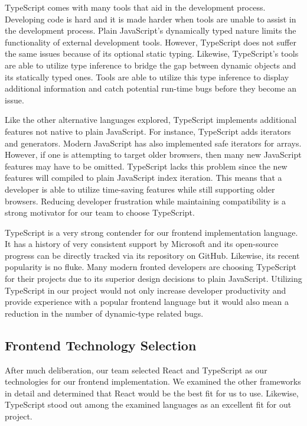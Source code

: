 \documentclass[12pt]{report}
\begin{document}
\begin{enumerate}
TypeScript comes with many tools that aid in the development process. Developing code is hard and it is made harder when tools are unable to assist in the development process. Plain JavaScript's dynamically typed nature limits the functionality of external development tools. However, TypeScript does not suffer the same issues because of its optional static typing. Likewise, TypeScript's tools are able to utilize type inference to bridge the gap between dynamic objects and its statically typed ones.\cite{typescripthomepage} Tools are able to utilize this type inference to display additional information and catch potential run-time bugs before they become an issue.

Like the other alternative languages explored, TypeScript implements additional features not native to plain JavaScript. For instance, TypeScript adds iterators and generators. Modern JavaScript has also implemented safe iterators for arrays. However, if one is attempting to target older browsers, then many new JavaScript features may have to be omitted. TypeScript lacks this problem since the new features will compiled to plain JavaScript index iteration. This means that a developer is able to utilize time-saving features while still supporting older browsers. Reducing developer frustration while maintaining compatibility is a strong motivator for our team to choose TypeScript.

TypeScript is a very strong contender for our frontend implementation language. It has a history of very consistent support by Microsoft and its open-source progress can be directly tracked via its repository on GitHub. Likewise, its recent popularity is no fluke. Many modern fronted developers are choosing TypeScript for their projects due to its superior design decisions to plain JavaScript. Utilizing TypeScript in our project would not only increase developer productivity and provide experience with a popular frontend language but it would also mean a reduction in the number of dynamic-type related bugs.

\subsection*{Frontend Technology Selection}

After much deliberation, our team selected React and TypeScript as our technologies for our frontend implementation. We examined the other frameworks in detail and determined that React would be the best fit for us to use. Likewise, TypeScript stood out among the examined languages as an excellent fit for out project.


\end{enumerate}
\end{document}

